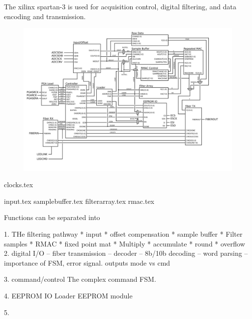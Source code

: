 The xilinx spartan-3 is used for acquisition control, digital filtering, and data encoding and transmission. 

\begin{figure}[h!]
\includegraphics[scale=0.7]{FPGA.svg}
\end{figure}

{clocks.tex}

{input.tex}
{samplebuffer.tex}
{filterarray.tex}
{rmac.tex}

Functions can be separated into

1. THe filtering pathway
  * input
  * offset compensation
  * sample buffer
  * Filter samples
  * RMAC
     * fixed point mat
     * Multiply
     * accumulate
     * round 
     * overflow
2. digital I/O -- fiber transmission
   -- decoder
   -- 8b/10b decoding
   -- word parsing -- importance of FSM, error signal. 
   outputs 
     mode vs cmd

3. command/control
   The complex command FSM. 

4. EEPROM IO
   Loader
   EEPROM module

5. 

